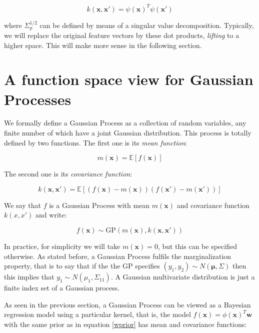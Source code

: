 \documentclass[10pt,a4paper,twoside]{book}
\begin{document}
\begin{equation}
k(\boldsymbol{x}, \boldsymbol{x'}) = \psi(\boldsymbol{x})^T\psi(\boldsymbol{x'})
\end{equation}

where $\Sigma_p^{1/2}$ can be defined by means of a singular value decomposition. Typically, we will replace the original feature vectors by these dot products, \textit{lifting} to a higher space. This will make more sense in the following section.

\section{A function space view for Gaussian Processes}

We formally define a Gaussian Process as a collection of random variables, any finite number of which have a joint Gaussian distribution. This process is totally defined by two functions. The first one is its \textit{mean function}:

\begin{equation}
m(\boldsymbol{x}) = \mathbb{E}\left[f(\boldsymbol{x})\right]
\end{equation} 

The second one is its \textit{covariance function}:

\begin{equation}
k(\boldsymbol{x}, \boldsymbol{x'}) = \mathbb{E}\left[\left( f(\boldsymbol{x}) - m(\boldsymbol{x}) \right)\left( f(\boldsymbol{x}') - m(\boldsymbol{x}')\right)\right]
\end{equation}

We say that $f$ is a Gaussian Process with mean $m(\boldsymbol{x})$ and covariance function $k(x, x')$ and write:

\begin{equation}
f(\boldsymbol{x}) \sim \mathrm{GP}\left(m(\boldsymbol{x}), k(\boldsymbol{x}, \boldsymbol{x'}) \right)
\end{equation}

In practice, for simplicity we will take $m(\boldsymbol{x}) = 0$, but this can be specified otherwise. As stated before, a Gaussian Process fulfils the marginalization property, that is to say that if the the GP specifies $(y_1, y_2) \sim N(\boldsymbol{\mu}, \Sigma)$ then this implies that $y_1 \sim N(\mu_1, \Sigma_{11})$. A Gaussian multivariate distribution is just a finite index set of a Gaussian process. 

As seen in the previous section, a Gaussian Process can be viewed as a Bayesian regression model using a particular kernel, that is, the model $f(\boldsymbol{x}) = \phi(\boldsymbol{x})^T \boldsymbol{w}$ with the same prior as in equation \ref{wprior} has mean and covariance functions:
\end{document}

